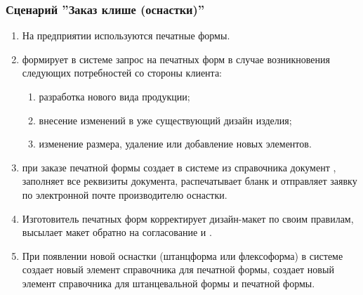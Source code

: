 \subsubsection{Сценарий ''Заказ клише (оснастки)''}
\label{bp:toolrequest_2}

\begin{enumerate}

\item На предприятии используются печатные формы.
\item \manager	 формирует в системе \gofro запрос на печатных форм в случае возникновения следующих потребностей со стороны клиента:
\begin{enumerate}
\item   	разработка нового вида продукции;
\item   	внесение изменений в уже существующий  дизайн изделия;
\item   	изменение размера, удаление или добавление новых элементов.
\end{enumerate}

\item \constructor	при заказе печатной формы создает в системе \gofro из справочника  документ , \constructor заполняет все реквизиты документа, распечатывает бланк и  отправляет заявку по электронной почте производителю оснастки.


\item Изготовитель печатных форм корректирует дизайн-макет по своим правилам, высылает макет обратно на согласование \constructor и \manager. 
\item	При появлении новой оснастки (штанцформа или флексоформа)  в системе \gofro \tehnolog создает новый элемент справочника  для печатной формы, \tehnolog создает новый элемент справочника  для штанцевальной формы и печатной формы.

\end{enumerate}